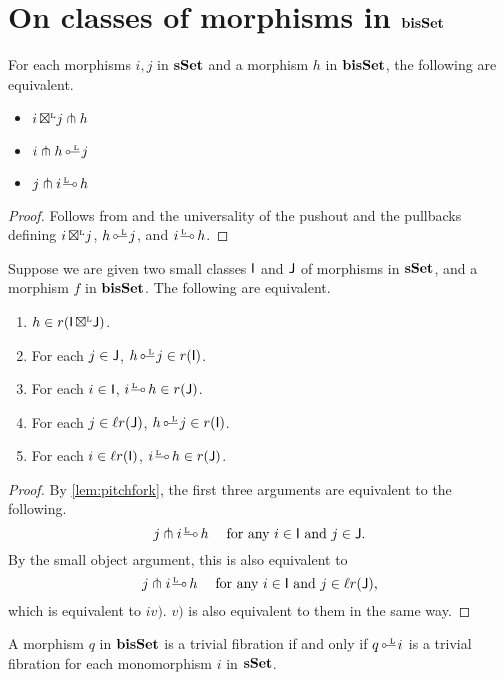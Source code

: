 \documentclass[a4paper,  dvipsnames, 11pt]{amsart}
\begin{document}
\section{On classes of morphisms in \texorpdfstring{$\mathbf{bisSet}$}{bisSet}}
\begin{lemma}
	\label{lem:pitchfork}
	For each morphisms $i,j$ in $\mathbf{sSet}$ and a morphism $h$ in $\mathbf{bisSet}$, the following are equivalent.
	\begin{itemize}
		\item %
			$i{\mathrel{\,\boxtimes^{\text{\tiny{L}}}}} j\pitchfork h$
		\item %
			$i\pitchfork h\lollipopL j$
		\item %
			$j\pitchfork i\rollipopL h$
	\end{itemize}
\end{lemma}
\begin{proof}
	Follows from  and the universality of the pushout and the pullbacks defining
	$i{\mathrel{\,\boxtimes^{\text{\tiny{L}}}}} j$, $h\lollipopL j$, and $i\rollipopL h$.
\end{proof}
\begin{lemma}
	\label{lem:rIbtJ}
	Suppose we are given two small classes $\mathsf{I}$ and $\mathsf{J}$ of morphisms in $\mathbf{sSet}$, and a morphism $f$ in $\mathbf{bisSet}$.
	The following are equivalent.
	\begin{enumerate}
		\item %
			$h\in r(\mathsf{I}{\mathrel{\,\boxtimes^{\text{\tiny{L}}}}}\mathsf{J})$.
		\item %
			For each $j\in\mathsf{J}$, $h\lollipopL j\in r(\I)$.
		\item %
			For each $i\in\mathsf{I}$, $i\rollipopL h\in r(\J)$.
		\item %
			For each $j\in\ell r(\mathsf{J})$, $h\lollipopL j\in r(\I)$.
		\item %
			For each $i\in\ell r(\mathsf{I})$, $i\rollipopL h\in r(\J)$.
	\end{enumerate}
\end{lemma}
\begin{proof}
	By \cref{lem:pitchfork}, the first three arguments are equivalent to the following.
	\[
		j \pitchfork i\rollipopL h
		\hspace{3ex}
		\text{for any $i\in\I$ and $j\in\J$.}
	\]
	By the small object argument,
	this is also equivalent to
	\[
		j \pitchfork i\rollipopL h
		\hspace{3ex}
		\text{for any $i\in\I$ and $j\in\ell r(\J)$,}
	\]
	which is equivalent to $iv)$.
	$v)$ is also equivalent to them in the same way.
\end{proof}
\begin{corollary}
	\label{cor:biTrivfib}
	A morphism $q$ in $\mathbf{bisSet}$ is a trivial fibration
	if and only if
	$q\lollipopL i$ is a trivial fibration
	for each monomorphism $i$ in $\mathbf{sSet}$.
\end{corollary}
\end{document}
